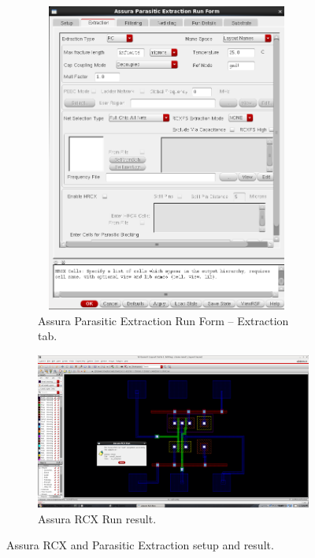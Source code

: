 \documentclass[11pt]{article}
\begin{document}
\begin{figure}[!h]
\begin{subfigure}[h]{0.5\textwidth}
\begin{center}
            \includegraphics[width=0.95\textwidth,height=4in]{rcxExtraction}
            \caption{Assura Parasitic Extraction Run Form -- Extraction tab.}
        \end{center}
    \end{subfigure}
    \vspace{0.1in}
    \begin{subfigure}[h]{\textwidth}
        \includegraphics[width=\textwidth]{rcxOutput}
        \caption{Assura RCX Run result.}
    \end{subfigure}
    \caption{Assura RCX and Parasitic Extraction setup and result.}
\end{figure}
\end{document}
